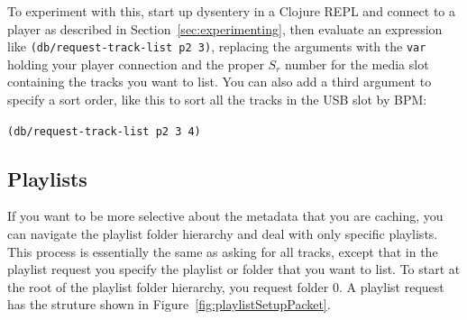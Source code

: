 \documentclass[11pt]{article}
\begin{document}
To experiment with this, start up dysentery in a Clojure REPL and
connect to a player as described in Section~\ref{sec:experimenting},
then evaluate an expression like {\tt (db/request-track-list p2 3)},
replacing the arguments with the {\tt var} holding your player
connection and the proper $S_r$ number for the media slot containing
the tracks you want to list. You can also add a third argument to
specify a sort order, like this to sort all the tracks in the USB slot
by BPM:

{\tt (db/request-track-list p2 3 4)}


\subsection{Playlists}

If you want to be more selective about the metadata that you are
caching, you can navigate the playlist folder hierarchy and deal with
only specific playlists. This process is essentially the same as asking
for all tracks, except that in the playlist request you specify the
playlist or folder that you want to list. To start at the root of the
playlist folder hierarchy, you request folder 0. A playlist request
has the struture shown in Figure~\ref{fig:playlistSetupPacket}.
\end{document}

